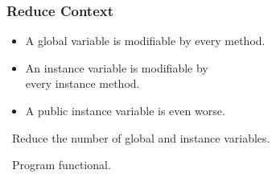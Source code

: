 \begin{frame}

\frametitle{Reduce Context}

\begin{itemize}

\item A global variable is modifiable by every method.

\item An instance variable is modifiable by \\ every instance method.

\item A public instance variable is even worse.

\end{itemize}

\vspace{\fill}

\begin{center}

\leftthumbsup~Reduce the number of global and instance variables.~\rightthumbsup

\end{center}

\begin{center}

\leftthumbsup~Program functional.~\rightthumbsup

\end{center}

\end{frame}
